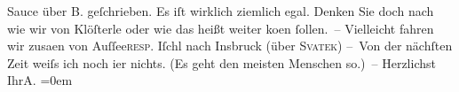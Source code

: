 \begin{ledgroupsized}[t]{13cm}
               Sauce über B. geſchrieben. Es iſt wirklich
               ziemlich egal. Denken Sie doch nach\strikeout{,} wie wir von Klöſterle oder wie das heißt weiter ko{\geminationm}en ſollen. – Vielleicht fahren wir zusa{\geminationm}en von Auſſee\textsc{resp}. Iſchl nach Insbruck (über \textsc{Svatek})\pend
           \pstart
           – Von der nächſten Zeit weiſs ich noch i{\geminationm}er nichts. (Es
               geht den meisten Menschen so.) –\pend
           \pstart
           Herzlichst{\\[\baselineskip]}Ihr\spacefill\mbox{A.}\pend
           \leftskip=0em{}
         
         \endnumbering{}\end{ledgroupsized}  \newcommand{\dateiname}{L01055}\newcommand{\titel}{Arthur Schnitzler an Richard Beer-Hofmann, 15. 7. 1900}\newcommand{\editorInnen}{Martin Anton Müller und Gerd-Hermann Susen}
      